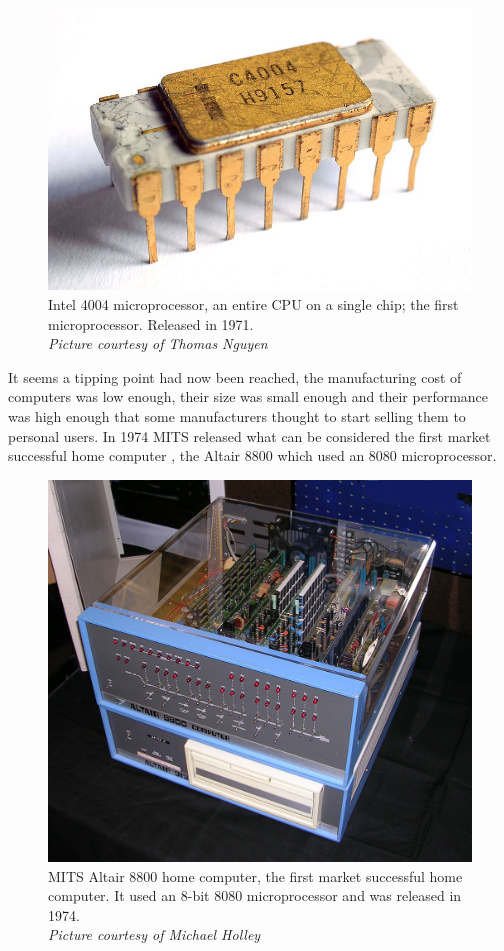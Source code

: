 \begin{figure} \begin{center}
\includegraphics[width=.3\linewidth]{pics/intel_4004} 
\end{center} 
\caption{Intel 4004 microprocessor, an entire CPU on a single chip; the first microprocessor. Released in 1971.\\ \textit{\small{Picture courtesy of Thomas Nguyen}}}
\end{figure} 


It seems a tipping point had now been reached, the manufacturing cost of computers was low enough, their size was small enough and their performance was high enough that some manufacturers thought to start selling them to personal users. In 1974 MITS released what can be considered the first market successful home computer \cite{Dorf95}, the Altair 8800 which used an 8080 microprocessor. \\

\begin{figure} \begin{center}
\includegraphics[width=.3\linewidth]{pics/altair_8800_computer} 
\end{center} 
\caption{MITS Altair 8800 home computer, the first market successful home computer. It used an 8-bit 8080 microprocessor and was released in 1974.\\ \textit{\small{Picture courtesy of  Michael Holley}}}
\end{figure}

